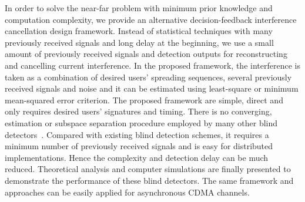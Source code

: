 \documentclass[a4paper,10pt,fleqn, twocolumn]{IEEETran}
\begin{document}
In order to solve the near-far problem with minimum prior
knowledge and computation complexity, we provide an alternative
decision-feedback interference cancellation design framework.
Instead of statistical techniques with many previously received
signals and long delay at the beginning, we use a small amount of
previously received signals and detection outputs for
reconstructing and cancelling current interference. In the
proposed framework, the interference is taken as a combination of
desired users' spreading sequences, several previously received
signals and noise and it can be estimated using least-square or
minimum mean-squared error criterion. The proposed framework are
simple, direct and only requires desired users' signatures and
timing. There is no converging, estimation or subspace separation
procedure employed by many other blind
detectors~\cite{Madh94,Honi95,Wang98,Wang99}. Compared with
existing blind detection schemes, it requires a minimum number of
previously received signals and is easy for distributed
implementations. Hence the complexity and detection delay can be
much reduced. Theoretical analysis and computer simulations are
finally presented to demonstrate the performance of these blind
detectors. The same framework and approaches can be easily applied
for asynchronous CDMA channels.
\end{document}
